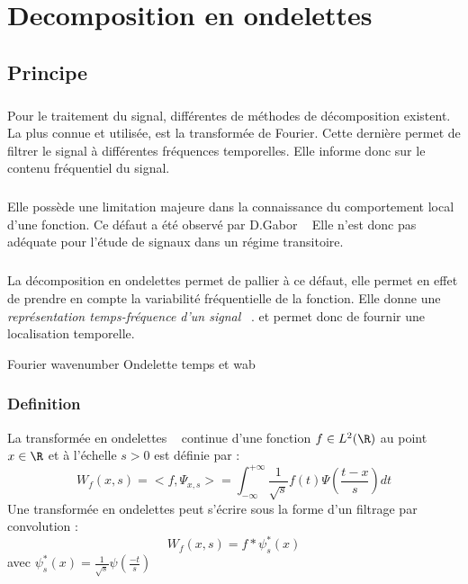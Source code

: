 
\chapter{Decomposition en ondelettes}



\section{Principe}
\paragraph{}
Pour le traitement du signal, différentes de méthodes de décomposition existent.
La plus connue et utilisée, est la transformée de Fourier. Cette dernière permet de filtrer le signal à différentes fréquences temporelles. Elle informe donc sur le contenu fréquentiel du signal.
\paragraph{}
Elle possède une limitation majeure dans la connaissance du comportement local d'une fonction.
Ce défaut a été observé par D.Gabor  ~\cite{}
Elle n'est donc pas adéquate pour l'étude de signaux dans un régime transitoire.
\paragraph{}
La décomposition en ondelettes permet de pallier à ce défaut, elle permet en effet de prendre en compte la variabilité fréquentielle de la fonction. 
Elle donne une \emph{représentation temps-fréquence d'un signal} ~\cite{JBigot}.
et permet donc de fournir une localisation temporelle.

Fourier  wavenumber 
Ondelette  temps et wab
\subsection{Definition}
La transformée en ondelettes ~\cite{JBigot} continue d'une fonction $f  \in L^{2}(\R)$ au point $x \in \R $
et à l'échelle $ s>0 $ est définie par  :
\begin{equation}
W_{f}(x,s) = <f,\Psi_{x,s}> = \int^{+\infty}_{- \infty} \frac{1}{\sqrt{s}}f(t)\Psi(\frac{t-x}{s})dt
\end{equation} 
Une transformée en ondelettes peut s'écrire sous la forme d'un filtrage par convolution :
\begin{equation}
W_{f}(x,s) = f * \psi^{*}_{s}(x)
\end{equation}
avec  $\psi^{*}_{s}(x) = \frac{1}{\sqrt{s}} \psi(\frac{-t}{s})$

